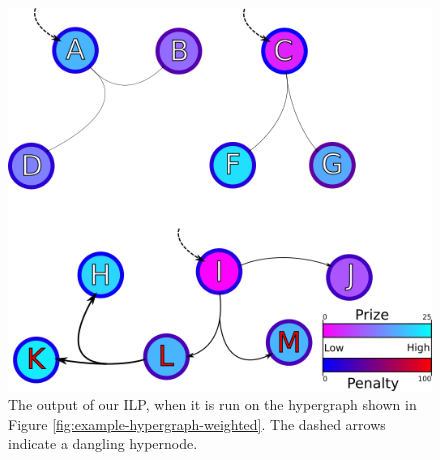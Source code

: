 \documentclass[12pt,twoside]{reedthesis}
\theoremstyle{definition}
\begin{document}
\begin{figure}[hp]
  \begin{center}
    \includegraphics{example-hypergraph-weighted-after-ILP}
  \caption[Output from ILP with disconnected sub-hypergraphs]{The output of our ILP, when it is run on the hypergraph shown in Figure \ref{fig:example-hypergraph-weighted}. The dashed arrows indicate a dangling hypernode.}
  \label{fig:example-hypergraph-weighted-after-ILP}
  \end{center}
\end{figure}
\end{document}
